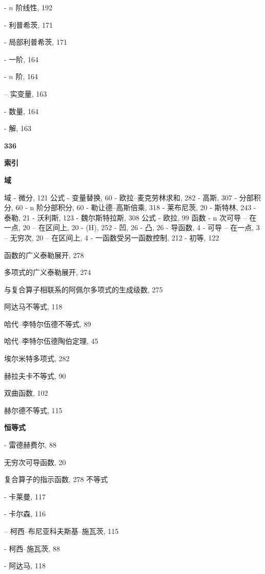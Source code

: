 - \(n\) 阶线性, 192

- 利普希茨, 171

- 局部利普希茨, 171

- 一阶, 164

- \(n\) 阶, 164

-- 实变量, 163

- 数量, 164

- 解, 163

\par\noindent\textbf{336}\par

\par\noindent\textbf{索引}\par

\par\noindent\textbf{域}\par

域 - 微分, 121 公式 - 变量替换, 60 - 欧拉–麦克劳林求和, 282 - 高斯, 307 - 分部积分, 60 - n 阶分部积分, 60 - 勒让德–高斯倍乘, 318 - 莱布尼茨, 20 - 斯特林, 243 - 泰勒, 21 - 沃利斯, 123 - 魏尔斯特拉斯, 308 公式 - 欧拉, 99 函数 - n 次可导 -- 在一点, 20 -- 在区间上, 20 - (H), 252 - 凹, 26 - 凸, 26 - 导函数, 4 - 可导 -- 在一点, 3 -- 无穷次, 20 -- 在区间上, 4 - 一函数受另一函数控制, 212 - 初等, 122

函数的广义泰勒展开, 278

多项式的广义泰勒展开, 274

与复合算子相联系的阿佩尔多项式的生成级数, 275

阿达马不等式, 118

哈代–李特尔伍德不等式, 89

哈代–李特尔伍德陶伯定理, 45

埃尔米特多项式, 282

赫拉夫卡不等式, 90

双曲函数, 102

赫尔德不等式, 115

\par\noindent\textbf{恒等式}\par

- 雷德赫费尔, 88

无穷次可导函数, 20

复合算子的指示函数, 278 不等式

- 卡莱曼, 117

- 卡尔森, 116

-- 柯西–布尼亚科夫斯基–施瓦茨, 115

- 柯西–施瓦茨, 88

- 阿达马, 118

